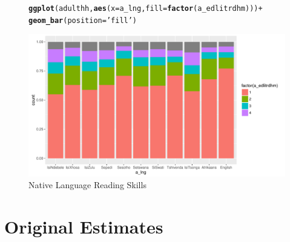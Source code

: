 \documentclass[a4paper,british]{article}\usepackage[]{graphicx}\usepackage[]{color}
\makeatletter
\def\maxwidth{ %
  \ifdim\Gin@nat@width>\linewidth
    \linewidth
  \else
    \Gin@nat@width
  \fi
}
\newcommand{\hlstr}[1]{\textcolor[rgb]{0.192,0.494,0.8}{#1}}%
\newcommand{\hlopt}[1]{\textcolor[rgb]{0,0,0}{#1}}%
\newcommand{\hlstd}[1]{\textcolor[rgb]{0.345,0.345,0.345}{#1}}%
\newcommand{\hlkwc}[1]{\textcolor[rgb]{0.333,0.667,0.333}{#1}}%
\newcommand{\hlkwd}[1]{\textcolor[rgb]{0.737,0.353,0.396}{\textbf{#1}}}%
\newenvironment{kframe}{%
 \def\at@end@of@kframe{}%
 \ifinner\ifhmode%
  \def\at@end@of@kframe{\end{minipage}}%
  \begin{minipage}{\columnwidth}%
 \fi\fi%
 \def\FrameCommand##1{\hskip\@totalleftmargin \hskip-\fboxsep
 \colorbox{shadecolor}{##1}\hskip-\fboxsep
     \hskip-\linewidth \hskip-\@totalleftmargin \hskip\columnwidth}%
 \MakeFramed {\advance\hsize-\width
   \@totalleftmargin\z@ \linewidth\hsize
   \@setminipage}}%
 {\par\unskip\endMakeFramed%
 \at@end@of@kframe}
\newenvironment{knitrout}{}{} %
\makeatother
\begin{document}
\begin{figure}[H]
\caption{Native Language Reading Skills}
\label{fig:rdhm}

\begin{knitrout}
\color{fgcolor}\begin{kframe}
\begin{alltt}
\hlkwd{ggplot}\hlstd{(adulthh,} \hlkwd{aes}\hlstd{(}\hlkwc{x} \hlstd{= a_lng,} \hlkwc{fill} \hlstd{=} \hlkwd{factor}\hlstd{(a_edlitrdhm)) )} \hlopt{+}
        \hlkwd{geom_bar}\hlstd{(}\hlkwc{position} \hlstd{=} \hlstr{'fill'}\hlstd{)}
\end{alltt}
\end{kframe}
\includegraphics[width=\maxwidth]{../Making-Next-Billion-Demand-Access/misc/latex-read_native-1} 

\end{knitrout}
\end{figure}


\section{Original Estimates}
\end{document}
